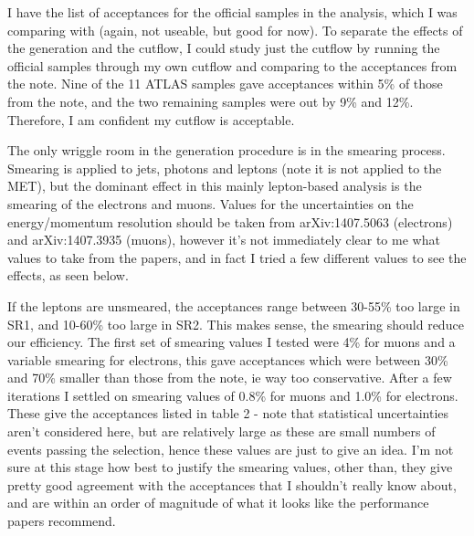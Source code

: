 \begin{flushleft}
\bigskip
I have the list of acceptances for the official samples in the analysis, which I was comparing with (again, not useable, but good for now). To separate the effects of the generation and the cutflow, I could study just the cutflow by running the official samples through my own cutflow and comparing to the acceptances from the note. Nine of the 11 ATLAS samples gave acceptances within 5\% of those from the note, and the two remaining samples were out by 9\% and 12\%. Therefore, I am confident my cutflow is acceptable.

\bigskip
The only wriggle room in the generation procedure is in the smearing process. Smearing is applied to jets, photons and leptons (note it is not applied to the MET), but the dominant effect in this mainly lepton-based analysis is the smearing of the electrons and muons. Values for the uncertainties on the energy/momentum resolution should be taken from arXiv:1407.5063 (electrons) and arXiv:1407.3935 (muons), however it's not immediately clear to me what values to take from the papers, and in fact I tried a few different values to see the effects, as seen below.

\bigskip
If the leptons are unsmeared, the acceptances range between 30-55\% too large in SR1, and 10-60\% too large in SR2. This makes sense, the smearing should reduce our efficiency. The first set of smearing values I tested were 4\% for muons and a variable smearing for electrons, this gave acceptances which were between 30\% and 70\% smaller than those from the note, ie way too conservative. After a few iterations I settled on smearing values of 0.8\% for muons and 1.0\% for electrons. These give the acceptances listed in table 2 - note that statistical uncertainties aren't considered here, but are relatively large as these are small numbers of events passing the selection, hence these values are just to give an idea. I'm not sure at this stage how best to justify the smearing values, other than, they give pretty good agreement with the acceptances that I shouldn't really know about, and are within an order of magnitude of what it looks like the performance papers recommend.


\end{flushleft}

